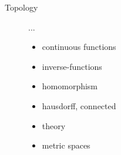 \documentclass[10pt,twoside,a4paper]{article}
\begin{document}
\begin{description}
  \item[Topology] ...
    \begin{itemize}
      \item continuous functions
      \item inverse-functions
      \item homomorphism
      \item hausdorff, connected
      \item theory
      \item metric spaces
    \end{itemize}
\end{description}
\end{document}
